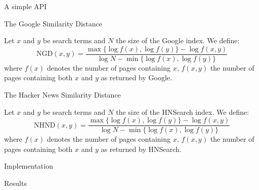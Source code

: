 \documentclass[12pt]{beamer}
\begin{document}
    \begin{frame}{A simple API}
    \end{frame}

    \begin{frame}{The Google Similarity Distance}
        \begin{definition}
            Let \(x\) and \(y\) be search terms and \(N\) the size of the Google index. We define:
            \[
                \text{NGD}(x,y) = \frac{\max{\{\log{f(x)}, \log{f(y)}\}} - \log{f(x,y)}}{\log{N} - \min{\{\log{f(x)}, \log{f(y)}\}}}
            \]
            where \(f(x)\) denotes the number of pages containing \(x\), \(f(x,y)\) the number of pages containing both \(x\) and \(y\) as returned by Google.
        \end{definition}
    \end{frame}

    \begin{frame}{The Hacker News Similarity Distance}
        \begin{definition}
            Let \(x\) and \(y\) be search terms and \(N\) the size of the HNSearch index. We define:
            \[
                \text{NHND}(x,y) = \frac{\max{\{\log{f(x)}, \log{f(y)}\}} - \log{f(x,y)}}{\log{N} - \min{\{\log{f(x)}, \log{f(y)}\}}}
            \]
            where \(f(x)\) denotes the number of pages containing \(x\), \(f(x,y)\) the number of pages containing both \(x\) and \(y\) as returned by HNSearch.
        \end{definition}
    \end{frame}

    \begin{frame}{Implementation}
    \end{frame}

    \begin{frame}{Results}
    \end{frame}
\end{document}

